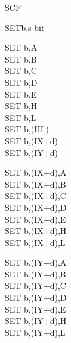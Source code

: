 \begin{basedescript}{
	\desclabelstyle{\multilinelabel}
	\desclabelwidth{3cm}}
\begin{DetailItem}{SCF}{}
		\begin{DetailTiming}
		\end{DetailTiming}

	\end{DetailItem}

	\pagebreak


	\begin{DetailItem}{SET}{b,s}
		{ bit}
		{}

		\begin{DetailVariants}
			SET b,A\\
			SET b,B\\
			SET b,C\\
			SET b,D\\
			SET b,E\\
			SET b,H\\
			SET b,L\\
			SET b,(HL)\\
			SET b,(IX+d)\\
			SET b,(IY+d)

			\columnbreak
			SET b,(IX+d),A\UNDOC\\
			SET b,(IX+d),B\UNDOC\\
			SET b,(IX+d),C\UNDOC\\
			SET b,(IX+d),D\UNDOC\\
			SET b,(IX+d),E\UNDOC\\
			SET b,(IX+d),H\UNDOC\\
			SET b,(IX+d),L\UNDOC

			\columnbreak
			SET b,(IY+d),A\UNDOC\\
			SET b,(IY+d),B\UNDOC\\
			SET b,(IY+d),C\UNDOC\\
			SET b,(IY+d),D\UNDOC\\
			SET b,(IY+d),E\UNDOC\\
			SET b,(IY+d),H\UNDOC\\
			SET b,(IY+d),L\UNDOC
		\end{DetailVariants}


\end{DetailItem}
\end{basedescript}
